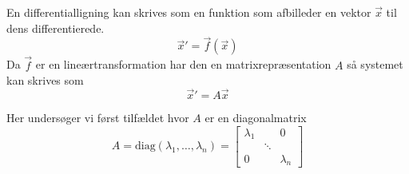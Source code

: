 %
%

En differentialligning kan skrives som en funktion som afbilleder en vektor
$\vec{x}$ til dens differentierede.
\[
	\vec{x}'=\vec{f}(\vec{x})
\]
Da $\vec{f}$ er en lineærtransformation har den en matrixrepræsentation $A$ så 
systemet kan skrives som
\[
	\vec{x}'=A \vec{x}
\]

Her undersøger vi først tilfældet hvor $A$ er en diagonalmatrix
\[
	A = \text{diag}(\lambda_1, \dotsc, \lambda_n) =  \begin{bmatrix}
		\lambda_1 &        & 0 \\
		          & \ddots & \\
		0         &        & \lambda_n
	\end{bmatrix}
\]
